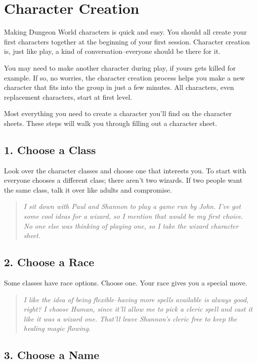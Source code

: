 \chapter{Character Creation}

Making Dungeon World characters is quick and easy. You should all create your first characters together at the beginning of your first session. Character creation is, just like play, a kind of conversation--everyone should be there for it.

You may need to make another character during play, if yours gets killed for example. If so, no worries, the character creation process helps you make a new character that fits into the group in just a few minutes. All characters, even replacement characters, start at first level.

Most everything you need to create a character you'll find on the character sheets. These steps will walk you through filling out a character sheet.
\section{1. Choose a Class}

Look over the character classes and choose one that interests you. To start with everyone chooses a different class; there aren't two wizards. If two people want the same class, talk it over like adults and compromise.

\begin{quote}
\emph{I sit down with Paul and Shannon to play a game run by John. I've got some cool ideas for a wizard, so I mention that would be my first choice. No one else was thinking of playing one, so I take the wizard character sheet.}
\end{quote}
\section{2. Choose a Race}

Some classes have race options. Choose one. Your race gives you a special move.

\begin{quote}
\emph{I like the idea of being flexible--having more spells available is always good, right? I choose Human, since it'll allow me to pick a cleric spell and cast it like it was a wizard one. That'll leave Shannon's cleric free to keep the healing magic flowing.}
\end{quote}
\section{3. Choose a Name}


